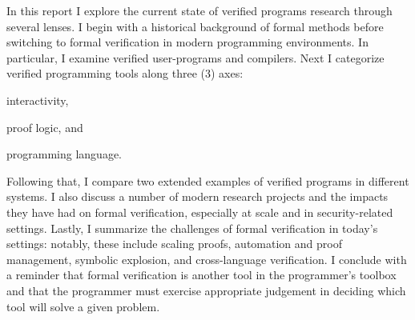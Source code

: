 In this report I explore the current state of verified programs research through
several lenses. I begin with a historical background of formal methods before
switching to formal verification in modern programming environments. In
particular, I examine verified user-programs and compilers. Next I categorize
verified programming tools along three (3) axes:
\begin{inlist}
\item interactivity,
\item proof logic, and
\item programming language.
\end{inlist}
Following that, I compare two extended examples of verified programs in
different systems. I also discuss a number of modern research projects and the
impacts they have had on formal verification, especially at scale and in
security-related settings. Lastly, I summarize the challenges of formal
verification in today's settings: notably, these include scaling proofs,
automation and proof management, symbolic explosion, and cross-language
verification. I conclude with a reminder that formal verification is another
tool in the programmer's toolbox and that the programmer must exercise
appropriate judgement in deciding which tool will solve a given problem.
